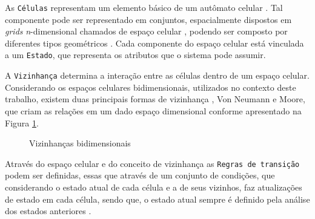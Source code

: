 \documentclass[
	11pt,				%
	openright,			%
	oneside,			%
	a4paper,			%
	english,			%
	french,				%
	spanish,			%
	brazil,				%
	]{abntex2}
\begin{document}
\par As \texttt{Células} representam um elemento básico de um autômato celular \cite{Leite2016}. Tal componente pode ser representado em conjuntos, espacialmente dispostos em \textit{grids} \textit{n}-dimensional \cite{Shiffman2012} chamados de espaço celular \cite{Liu2008}, podendo ser composto por diferentes tipos geométricos \cite{Melotti2009}. Cada componente do espaço celular está vinculada a um \texttt{Estado}, que representa os atributos que o sistema pode assumir.
\par A \texttt{Vizinhança} determina a interação entre as células dentro de um espaço celular. Considerando os espaços celulares bidimensionais, utilizados no contexto deste trabalho, existem duas principais formas de vizinhança \cite{Leite2016}, Von Neumann e Moore, que criam as relações em um dado espaço dimensional conforme apresentado na Figura \ref{figure:neighbor}.

\begin{figure}[H]
    \centering
    \caption{Vizinhanças bidimensionais}
    \qquad
    \qquad
    \label{figure:neighbor}
\end{figure}

\par Através do espaço celular e do conceito de vizinhança as \texttt{Regras de transição} podem ser definidas, essas que através de um conjunto de condições, que considerando o estado atual de cada célula e a de seus vizinhos, faz atualizações de estado em cada célula, sendo que, o estado atual sempre é definido pela análise dos estados anteriores \cite{Shiffman2012}.
\end{document}
